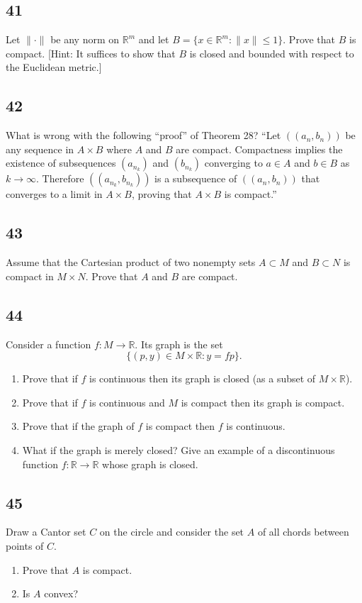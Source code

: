 \documentclass{amsart}
\begin{document}
\subsection*{41}
Let $\|\cdot\|$ be any norm on $\mathbb{R}^m$ and let $B = \{x \in \mathbb{R}^m : \|x\| \le 1\}$. Prove that $B$ is compact. [Hint: It suffices to show that $B$ is closed and bounded with respect to the Euclidean metric.]

\subsection*{42}
What is wrong with the following ``proof'' of Theorem 28? ``Let $((a_n,b_n))$ be any sequence in $A \times B$ where $A$ and $B$ are compact. Compactness implies the existence of subsequences $(a_{n_k})$ and $(b_{n_k})$ converging to $a \in A$ and $b \in B$ as $k \to \infty$. Therefore $((a_{n_k}, b_{n_k}))$ is a subsequence of $((a_n,b_n))$ that converges to a limit in $A \times B$, proving that $A \times B$ is compact.''

\subsection*{43}
Assume that the Cartesian product of two nonempty sets $A \subset M$ and $B \subset N$ is compact in $M \times N$. Prove that $A$ and $B$ are compact.

\subsection*{44}
Consider a function $f : M \to \mathbb{R}$. Its graph is the set
\[
\{(p,y) \in M \times \mathbb{R} : y = fp\}.
\]
\begin{enumerate}[label=(\alph*)]
\item Prove that if $f$ is continuous then its graph is closed (as a subset of $M \times \mathbb{R}$).
\item Prove that if $f$ is continuous and $M$ is compact then its graph is compact.
\item Prove that if the graph of $f$ is compact then $f$ is continuous.
\item What if the graph is merely closed? Give an example of a discontinuous function $f : \mathbb{R} \to \mathbb{R}$ whose graph is closed.
\end{enumerate}

\subsection*{45}
Draw a Cantor set $C$ on the circle and consider the set $A$ of all chords between points of $C$.
\begin{enumerate}[label=(\alph*)]
\item Prove that $A$ is compact.
\item[*(b)] Is $A$ convex?
\end{enumerate}
\end{document}
